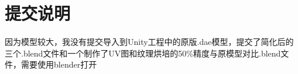 \documentclass{article}
\begin{document}
\section{提交说明}
\paragraph{}
因为模型较大，我没有提交导入到Unity工程中的原版.dae模型，提交了简化后的三个.blend文件和一个制作了UV图和纹理烘培的50\%精度与原模型对比.blend文件，需要使用blender打开
\end{document}
